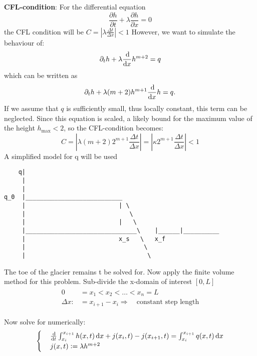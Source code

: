 \textbf{CFL-condition}:
For the differential equation
\begin{equation*}
    \frac{\partial h}{\partial t} + \lambda \frac{\partial h}{\partial x} = 0
\end{equation*}
%
the CFL condition will be $C = \left | \lambda \frac{\Delta t}{\Delta x}\right| < 1$
%
However, we want to simulate the behaviour of:
\begin{equation}
    \partial_th+\lambda \frac{\dif}{\dif{x}}h^{m+2} = q
\end{equation}
%
which can be written as
%
\begin{equation}
    \partial_th+\lambda (m+2)h^{m+1} \frac{\dif}{\dif{x}}h = q.
\end{equation}
%
If we assume that $q$ is sufficiently small, thus locally constant, this term can be neglected. Since this equation is scaled, a likely bound for the maximum value of the height $h_{\text{max}} < 2$, so the CFL-condition becomes:
\begin{equation*}
    C = \left | \lambda (m+2) 2^{m+1} \frac{\Delta t}{\Delta x}\right| = \left | \kappa 2^{m+1} \frac{\Delta t}{\Delta x}\right| < 1
\end{equation*}
A simplified model for q will be used

\begin{verbatim}
    q|
     |
     |
q_0  |___________________________
     |                          | \
     |                             \
     |                          |   \
     |_______________________________\    |______|__________
     |                          x_s   \   x_f
     |                                 \
     |                                  \
\end{verbatim}

The toe of the glacier remains t be solved for.
%
Now apply the finite volume method for this problem. Sub-divide the x-domain of interest $[0,L]$
%
\begin{align*}
 \begin{split}
     0 &= x_1 < x_2 < \dots < x_n = L\\
     \Delta x :&= x_{i+1} -x_i \Rightarrow \quad \text{constant step length}
 \end{split}   
\end{align*}

Now solve for numerically:
\begin{equation*}
    \begin{cases}
    & \frac{\dif}{\dif{t}}\int_{x_{i}}^{x_{i+1}} h(x,t) \dif{x} + j(x_i, t) - j(x_{i+1},t) = \int_{x_{i}}^{x_{i+1}} q(x,t) \dif{x} \\
    & j(x,t) := \lambda h^{m+2}
    \end{cases}
\end{equation*}

